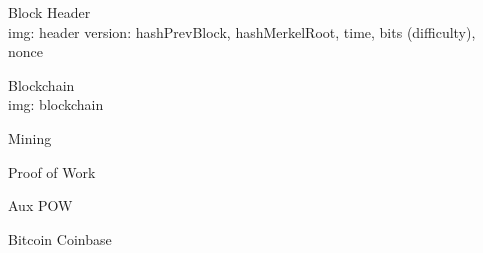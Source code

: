 \documentclass{beamer}
\begin{document}
\begin{frame}

    {\Huge Block Header}\\

    img: header version: hashPrevBlock, hashMerkelRoot, time, bits (difficulty), nonce



\end{frame}

\begin{frame}

    {\Huge Blockchain}\\

    img: blockchain

\end{frame}

\begin{frame}

    {\Huge Mining}\\

\end{frame}

\begin{frame}

    {\Huge Proof of Work}\\

\end{frame}

\begin{frame}

    {\Huge Aux POW}\\

\end{frame}

\begin{frame}

    {\Huge Bitcoin Coinbase}\\

\end{frame}
\end{document}

